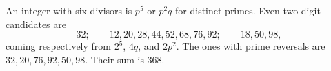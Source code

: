 An integer with six divisors is $p^5$ or $p^2q$ for distinct primes. Even two-digit candidates are
\[
32;\qquad12,20,28,44,52,68,76,92;\qquad18,50,98,
\]
coming respectively from $2^5$, $4q$, and $2p^2$. The ones with prime reversals are $32,20,76,92,50,98$. Their sum is $\boxed{368}$.
